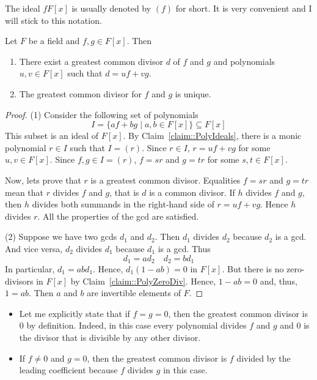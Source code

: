 The ideal $fF[x]$ is usually denoted by $(f)$ for short.
It is very convenient and I will stick to this notation.

\begin{claim}
\label{claim::PolyGCD}
Let $F$ be a field and $f,g\in F[x]$.
Then
\begin{enumerate}
\item There exist a greatest common divisor $d$ of $f$ and $g$ and polynomials $u,v\in F[x]$ such that $d = uf + v g$.

\item The greatest common divisor for $f$ and $g$ is unique.

\end{enumerate}
\end{claim}
\begin{proof}
(1) Consider the following set of polynomials
\[
I = \{a f + b g \mid a, b \in F[x]\}\subseteq F[x]
\]
This subset is an ideal of $F[x]$.
By Claim~\ref{claim::PolyIdeals}, there is a monic polynomial $r\in I$ such that $I = (r)$.
Since $r\in I$, $r = uf + vg$ for some $u, v\in F[x]$.
Since $f, g \in I = (r)$, $f = s r$ and $g = t r$ for some $s, t \in F[x]$.

Now, lets prove that $r$ is a greatest common divisor.
Equalities $f = s r$ and $g = t r$ mean that $r$ divides $f$ and $g$, that is $d$ is a common divisor.
If $h$ divides $f$ and $g$, then $h$ divides both summands in the right-hand side of  $r = uf + vg$.
Hence $h$ divides $r$.
All the properties of the gcd are satisfied.

(2) Suppose we have two gcds $d_1$ and $d_2$.
Then $d_1$ divides $d_2$ because $d_2$ is a gcd.
And vice versa, $d_2$ divides $d_1$ because $d_1$ is a gcd.
Thus
\[
d_1 = a d_2\quad d_2 = b d_1
\]
In particular, $d_1 = ab d_1$.
Hence, $d_1(1 - ab)= 0$ in $F[x]$.
But there is no zero-divisors in $F[x]$ by Claim~\ref{claim::PolyZeroDiv}.
Hence, $1 - ab = 0$ and, thus, $1 = ab$.
Then $a$ and $b$ are invertible elements of $F$.
\end{proof}

\begin{remarks}
\begin{itemize}
\item Let me explicitly state that if $f = g = 0$, then the greatest common divisor is $0$ by definition.
Indeed, in this case every polynomial divides $f$ and $g$ and $0$ is the divisor that is divisible by any other divisor.

\item If $f \neq 0$ and $g = 0$, then the greatest common divisor is $f$ divided by the leading coefficient because $f$ divides $g$ in this case.
\end{itemize}
\end{remarks}

